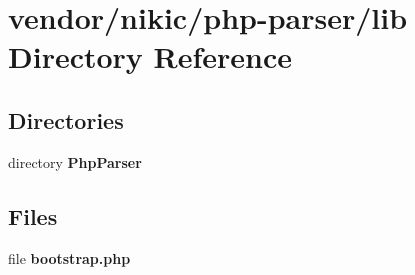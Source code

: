 \section{vendor/nikic/php-\/parser/lib Directory Reference}
\label{dir_440976a15ecb75ec44115bd17fbb4591}
\subsection*{Directories}
\begin{DoxyCompactItemize}
\item 
directory {\bf Php\+Parser}
\end{DoxyCompactItemize}
\subsection*{Files}
\begin{DoxyCompactItemize}
\item 
file {\bf bootstrap.\+php}
\end{DoxyCompactItemize}
